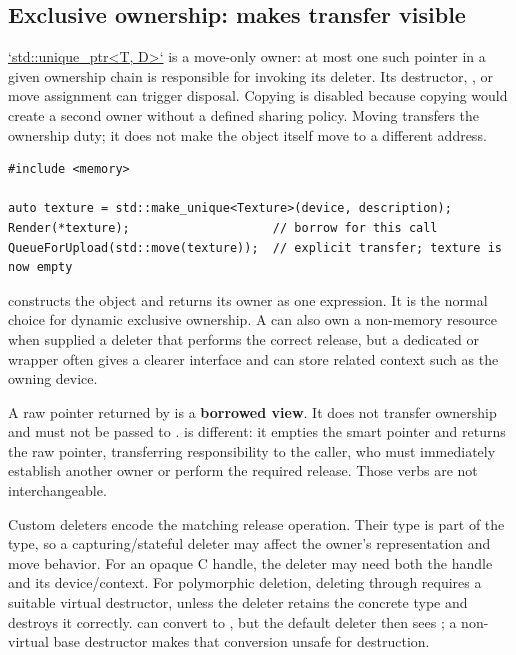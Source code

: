 \subsection{\texorpdfstring{Exclusive ownership:  makes transfer visible}{Exclusive ownership: unique\_ptr makes transfer visible}}\label{01-foundations-i-ch004-exclusive-ownership-unique_ptr-makes-transfer-visible}

\hypertarget{01-foundations-i-ch004-exclusive-ownership-unique_ptr-makes-transfer-visible}{}

\hyperref[appendix-51602cabe815]{`std::unique\_ptr\textless T, D\textgreater`} is a move-only owner: at most one such pointer in a given ownership chain is responsible for invoking its deleter. Its destructor, , or move assignment can trigger disposal. Copying is disabled because copying would create a second owner without a defined sharing policy. Moving transfers the ownership duty; it does not make the object itself move to a different address.

\begin{verbatim}
#include <memory>

auto texture = std::make_unique<Texture>(device, description);
Render(*texture);                    // borrow for this call
QueueForUpload(std::move(texture));  // explicit transfer; texture is now empty
\end{verbatim}

 constructs the object and returns its owner as one expression. It is the normal choice for dynamic exclusive ownership. A  can also own a non-memory resource when supplied a deleter that performs the correct release, but a dedicated  or  wrapper often gives a clearer interface and can store related context such as the owning device.

A raw pointer returned by  is a \textbf{borrowed view}. It does not transfer ownership and must not be passed to .  is different: it empties the smart pointer and returns the raw pointer, transferring responsibility to the caller, who must immediately establish another owner or perform the required release. Those verbs are not interchangeable.

Custom deleters encode the matching release operation. Their type is part of the  type, so a capturing/stateful deleter may affect the owner's representation and move behavior. For an opaque C handle, the deleter may need both the handle and its device/context. For polymorphic deletion, deleting  through  requires a suitable virtual destructor, unless the deleter retains the concrete type and destroys it correctly.  can convert to , but the default deleter then sees ; a non-virtual base destructor makes that conversion unsafe for destruction.

